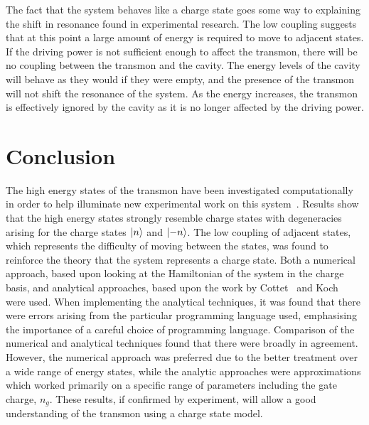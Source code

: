 \documentclass[11pt]{article}
\begin{document}
The fact that the system behaves like a charge state goes some way to explaining the shift in resonance found in experimental research. The low coupling suggests that at this point a large amount of energy is required to move to adjacent states. If the driving power is not sufficient enough to affect the transmon, there will be no coupling between the transmon and the cavity. The energy levels of the cavity will behave as they would if they were empty, and the presence of the transmon will not shift the resonance of the system. As the energy increases, the transmon is effectively ignored by the cavity as it is no longer affected by the driving power.


\section{Conclusion}
The high energy states of the transmon have been investigated computationally in order to help illuminate new experimental work on this system~\cite{lescanneDynamicsOffresonantlyPumped2018}. Results show that the high energy states strongly resemble charge states with degeneracies arising for the charge states $\ket{n}$ and $\ket{-n}$. The low coupling of adjacent states, which represents the difficulty of moving between the states, was found to reinforce the theory that the system represents a charge state. Both a numerical approach, based upon looking at the Hamiltonian of the system in the charge basis, and analytical approaches, based upon the work by Cottet~\cite{cottetImplementationQuantumBit2002} and Koch~\cite{kochChargeinsensitiveQubitDesign2007} were used. When implementing the analytical techniques, it was found that there were errors arising from the particular programming language used, emphasising the importance of a careful choice of programming language. Comparison of the numerical and analytical techniques found that there were broadly in agreement. However, the numerical approach was preferred due to the better treatment over a wide range of energy states, while the analytic approaches were approximations which worked primarily on a specific range of parameters including the gate charge, $n_g$. These results, if confirmed by experiment, will allow a good understanding of the transmon using a charge state model.

\clearpage


\appendix
\end{document}
